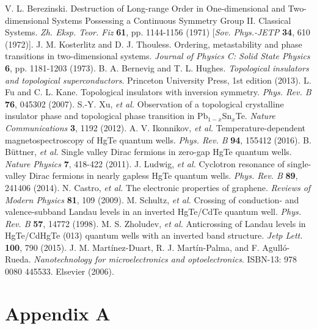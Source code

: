 \documentclass[titlepage,a4paper]{book}
\begin{document}
\begin{thebibliography}{99}
V. L. Berezinski. Destruction of Long-range Order in One-dimensional and Two-dimensional Systems Possessing a Continuous Symmetry Group II. Classical Systems. \textit{Zh. Eksp. Teor. Fiz} \textbf{61}, pp. 1144-1156 (1971) [\textit{Sov. Phys.-JETP} \textbf{34}, 610 (1972)].
J. M. Kosterlitz and D. J. Thouless. Ordering, metastability and phase transitions in two-dimensional systems. \textit{Journal of Physics C: Solid State Physics} \textbf{6}, pp. 1181-1203 (1973).
B. A. Bernevig and T. L. Hughes. \textit{Topological insulators and topological superconductors}. Princeton University Press, 1st edition (2013).
L. Fu and C. L. Kane. Topological insulators with inversion symmetry. \textit{Phys. Rev. B} \textbf{76}, 045302 (2007).
S.-Y. Xu, \textit{et al.} Observation of a topological crystalline insulator phase and topological phase transition in Pb$_{1-x}$Sn$_{x}$Te. \textit{Nature Communications} \textbf{3}, 1192 (2012).
A. V. Ikonnikov, \textit{et al.} Temperature-dependent magnetospectroscopy of HgTe quantum wells. \textit{Phys. Rev. B} \textbf{94}, 155412 (2016).
B. Büttner, \textit{et al.} Single valley Dirac fermions in zero-gap HgTe quantum wells. \textit{Nature Physics} \textbf{7}, 418-422 (2011).
J. Ludwig, \textit{et al.} Cyclotron resonance of single-valley Dirac fermions in nearly gapless HgTe quantum wells. \textit{Phys. Rev. B} \textbf{89}, 241406 (2014).
N. Castro, \textit{et al.} The electronic properties of graphene. \textit{Reviews of Modern Physics} \textbf{81}, 109 (2009).
M. Schultz, \textit{et al.} Crossing of conduction- and valence-subband Landau levels in an inverted HgTe/CdTe quantum well. \textit{Phys. Rev. B} \textbf{57}, 14772 (1998).
M. S. Zholudev, \textit{et al.} Anticrossing of Landau levels in HgTe/CdHgTe (013) quantum wells with an inverted band structure. \textit{Jetp Lett.} \textbf{100}, 790 (2015).
J. M. Martínez-Duart, R. J. Martín-Palma, and F. Agulló-Rueda. \textit{Nanotechnology for microelectronics and optoelectronics}. ISBN-13: 978 0080 445533. Elsevier (2006).

\end{thebibliography}

\appendix
\chapter{Appendix A}
\end{document}
